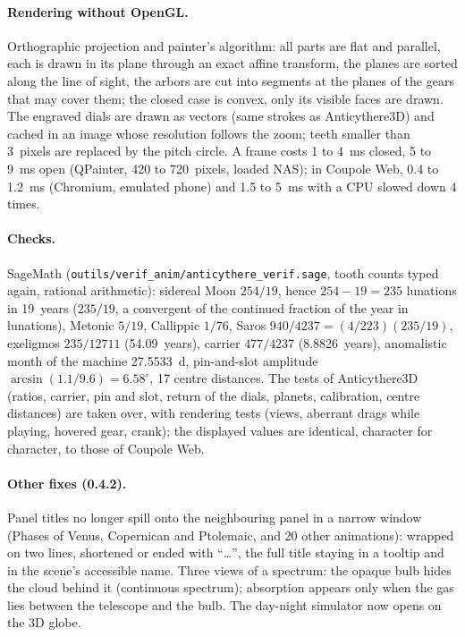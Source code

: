 \paragraph{Rendering without OpenGL.} Orthographic projection and painter's algorithm: all parts are flat and
parallel, each is drawn in its plane through an exact affine transform, the planes are sorted along the line of sight,
the arbors are cut into segments at the planes of the gears that may cover them; the closed case is convex, only its
visible faces are drawn. The engraved dials are drawn as vectors (same strokes as Anticythere3D) and cached in an image
whose resolution follows the zoom; teeth smaller than 3~pixels are replaced by the pitch circle. A frame costs 1 to
4~ms closed, 5 to 9~ms open (QPainter, 420 to 720~pixels, loaded NAS); in Coupole Web, 0.4 to 1.2~ms (Chromium,
emulated phone) and 1.5 to 5~ms with a CPU slowed down 4 times.

\paragraph{Checks.} SageMath (\texttt{outils/verif\_anim/anticythere\_verif.sage}, tooth counts typed again, rational
arithmetic): sidereal Moon $254/19$, hence $254-19=235$ lunations in 19~years ($235/19$, a convergent of the continued
fraction of the year in lunations), Metonic $5/19$, Callippic $1/76$, Saros $940/4237=(4/223)(235/19)$, exeligmos
$235/12711$ (54.09~years), carrier $477/4237$ (8.8826~years), anomalistic month of the machine 27.5533~d, pin-and-slot
amplitude $\arcsin(1.1/9.6)=6.58^\circ$, 17 centre distances. The tests of Anticythere3D (ratios, carrier, pin and
slot, return of the dials, planets, calibration, centre distances) are taken over, with rendering tests (views,
aberrant drags while playing, hovered gear, crank); the displayed values are identical, character for character, to
those of Coupole Web.


\paragraph{Other fixes (0.4.2).} Panel titles no longer spill onto the neighbouring panel in a narrow window (Phases
of Venus, Copernican and Ptolemaic, and 20 other animations): wrapped on two lines, shortened or ended with “…”, the
full title staying in a tooltip and in the scene's accessible name. Three views of a spectrum: the opaque bulb hides
the cloud behind it (continuous spectrum); absorption appears only when the gas lies between the telescope and the
bulb. The day-night simulator now opens on the 3D globe.

